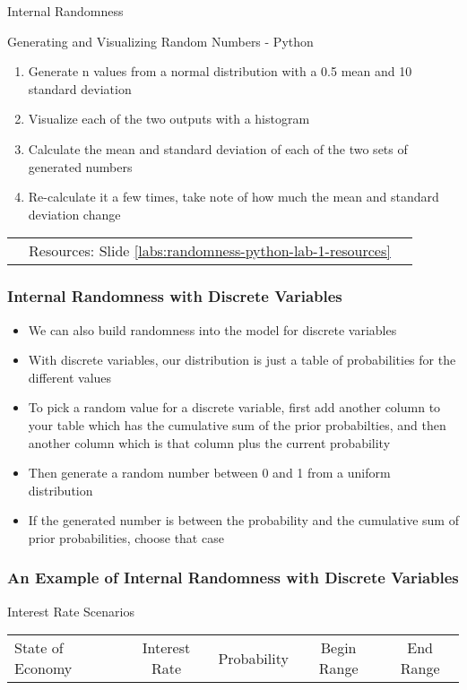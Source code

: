 \documentclass[handout, 11pt]{beamer}
\begin{document}
\begin{section}{Internal Randomness}
\begin{frame}
{\begin{block}{Generating and Visualizing Random Numbers - Python}
\begin{enumerate}
\item Generate n values from a normal distribution with a 0.5 mean and 10 standard deviation
\item Visualize each of the two outputs with a histogram
\item Calculate the mean and standard deviation of each of the two sets of generated numbers
\item Re-calculate it a few times, take note of how much the mean and standard deviation change
\end{enumerate}
\vfill
\begin{tabular*}{\textwidth}{@{\extracolsep{\fill}}ccc}
\toprule
\hfill & Resources: Slide \textcolor{blue}{\underline{\ref{labs:randomness-python-lab-1-resources}}} & \hfill\\

\end{tabular*}
\end{block}
}
\label{labs:randomness-python-lab-1}
\end{frame}
\begin{frame}
\frametitle{Internal Randomness with Discrete Variables}
\begin{itemize}
\item We can also build randomness into the model for discrete variables
\vfill
\item With discrete variables, our distribution is just a table of probabilities for the different values
\vfill
\item To pick a random value for a discrete variable, first add another column to your table which has the cumulative sum of the prior probabilties, and then another column which is that column plus the current probability
\vfill
\item Then generate a random number between 0 and 1 from a uniform distribution
\vfill
\item If the generated number is between the probability and the cumulative sum of prior probabilities, choose that case
\end{itemize}
\end{frame}
\begin{frame}
\frametitle{An Example of Internal Randomness with Discrete Variables}
\small
\begin{block}{Interest Rate Scenarios}
\begin{center}
\begin{tabular}{L{2cm}|cccc}
State of Economy & Interest Rate & Probability & Begin Range & End Range\\


\end{tabular}
\end{center}
\end{block}
\end{frame}
\end{section}
\end{document}
